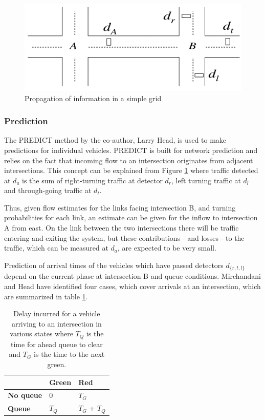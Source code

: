 \begin{figure}[!ht]
\begin{center}
\includegraphics[scale=0.5]{rhodes_prediction-strategy.png} 
\end{center}
\caption{Propagation of information in a simple grid}
\label{fig:rhodes_predict}
\end{figure}

\subsubsection*{Prediction}
The PREDICT method \cite{PREDICT} by the co-author, Larry Head, is used to make
predictions for individual vehicles. PREDICT is built for network
prediction and relies on the fact that incoming flow to an
intersection originates from adjacent intersections. This concept can
be explained from Figure \ref{fig:rhodes_predict} where traffic
detected at $d_a$ is the sum of right-turning traffic at detector
$d_r$, left turning traffic at $d_l$ and through-going traffic at
$d_t$.

Thus, given flow estimates for the links facing intersection B, and
turning probabilities for each link, an estimate can be given for the
inflow to intersection A from east. On the link between the two
intersections there will be traffic entering and exiting the system,
but these contributions - and losses - to the traffic, which can be
measured at $d_a$, are expected to be very small.

Prediction of arrival times of the vehicles which have passed detectors
$d_{\lbrace r,t,l \rbrace}$ depend on the current phase at
intersection B and queue conditions. Mirchandani and Head have
identified four cases, which cover arrivals at an intersection, which
are summarized in table \ref{tbl:delaycases}.

\begin{table}[!ht]
\begin{center}
\begin{tabular}{l|ll}
 & \textbf{Green} & \textbf{Red} \\ \hline
\textbf{No queue} & 0 & $T_G$ \\
\textbf{Queue} & $T_Q$ & $T_G$ + $T_Q$
\end{tabular}
\end{center}
\caption{Delay incurred for a vehicle arriving to an intersection in various states where $T_Q$ is the time for ahead queue to clear and $T_G$ is the time to the next green.}
\label{tbl:delaycases}
\end{table}


